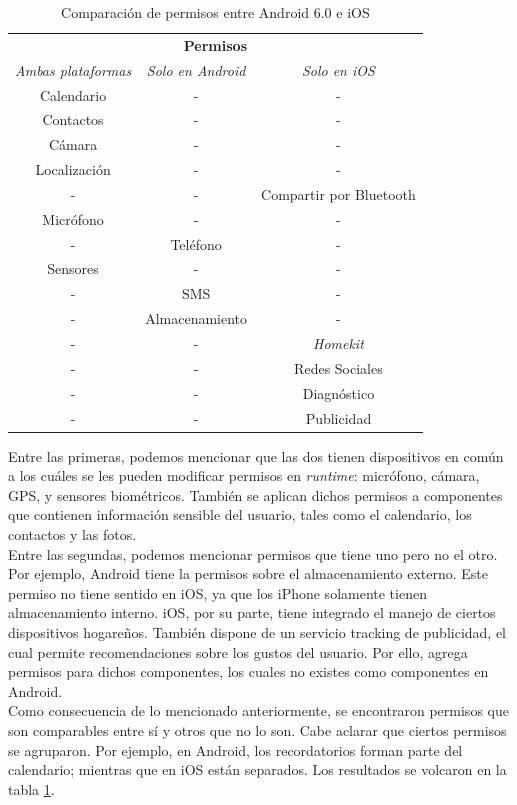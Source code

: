 \begin{table}[htbp]
	\center
	\begin{tabular}{c c c}
		\hline
		\multicolumn{3}{c}{\textbf{Permisos}} \\
		\emph{Ambas plataformas} 	& \emph{Solo en Android}	& \emph{Solo en iOS} \\ \hline    \hline
		Calendario	& -		& -	\\						
		Contactos	& -				& - \\						
		Cámara		& -				& -	\\						
		Localización& -				& -	\\						
		-			& -				& Compartir por Bluetooth\\ 
		Micrófono   & -				& - \\						
		-			& Teléfono		& -	\\						
		Sensores    & -    			& - \\						
		-			& SMS			& - \\						
		-			& Almacenamiento& - \\						
		-			& -				& \emph{Homekit} \\			
		-			& -				& Redes Sociales \\        	
		-			& -				& Diagnóstico \\        			
		-			& -				& Publicidad \\    			\hline
	\end{tabular}
	\caption{Comparación de permisos entre Android 6.0 e iOS}
	\label{tab:chapter03:compPerm}
\end{table}

Entre las primeras, podemos mencionar que las dos tienen dispositivos en común a los cuáles se les pueden modificar permisos en \textit{runtime}: micrófono, cámara, GPS, y sensores biométricos. También se aplican dichos permisos a componentes que contienen información sensible del usuario, tales como el calendario, los contactos y las fotos.\\
Entre las segundas, podemos mencionar permisos que tiene uno pero no el otro. Por ejemplo, Android tiene la permisos sobre el almacenamiento externo. Este permiso no tiene sentido en iOS, ya que los iPhone solamente tienen almacenamiento interno. iOS, por su parte, tiene integrado el manejo de ciertos dispositivos hogareños. También dispone de un servicio tracking de publicidad, el cual permite recomendaciones sobre los gustos del usuario. Por ello, agrega permisos para dichos componentes, los cuales no existes como componentes en Android.\\
Como consecuencia de lo mencionado anteriormente, se encontraron permisos que son comparables entre sí y otros que no lo son. Cabe aclarar que ciertos permisos se agruparon. Por ejemplo, en Android, los recordatorios forman parte del calendario; mientras que en iOS están separados. Los resultados se volcaron en la tabla \ref{tab:chapter03:compPerm}.\\

